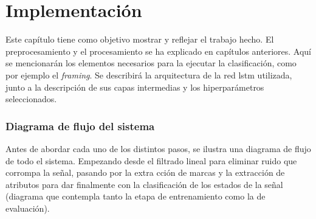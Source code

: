 \chapter{Implementación} \label{ch:results}

\indent Este capítulo tiene como objetivo mostrar y reflejar el trabajo hecho. El preprocesamiento y el
procesamiento se ha explicado en capítulos anteriores. Aquí se mencionarán los elementos necesarios para la ejecutar
la clasificación, como por ejemplo el \textit{framing}. Se describirá la arquitectura de la red \acrshort{lstm}
utilizada, junto a la descripción de sus capas intermedias y los hiperparámetros seleccionados. \bigskip

\subsection*{Diagrama de flujo del sistema} \label{subsec:flow-diagram}

\indent Antes de abordar cada uno de los distintos pasos, se ilustra una diagrama de flujo de todo el sistema.
Empezando desde el filtrado lineal para eliminar ruido que corrompa la señal, pasando por la extra cción de marcas y
la extracción de atributos para dar finalmente con la clasificación de los estados de la señal (diagrama que
contempla tanto la etapa de entrenamiento como la de evaluación).


